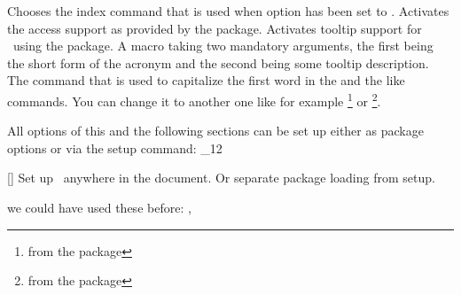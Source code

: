 \documentclass[load-preamble+]{cnltx-doc}
\makeatletter
\renewenvironment{commands}
  {%
    \cnltx@set@catcode_{12}%
    \let\command\cnltx@command
    \cnltxlist
  }
  {\endcnltxlist}
\makeatother
\begin{document}
\begin{options}
    Chooses the index command that is used when option  has been
    set to .
    Activates the access support as provided by the  package.
    Activates tooltip support for \acro\ using the
     package.
    A macro taking two mandatory arguments, the first being
    the short form of the acronym and the second being some tooltip
    description.
    The command that is used to capitalize the first word in the  and
    the like commands.  You can change it to another one like for example
    \footnote{from the  package} or
    \footnote{from the  package}.
\end{options}
 
All options of this and the following sections can be set up either as package
options or via the setup command:
\begin{commands}
  \command{acsetup}[]
   Set up \acro\ anywhere in the document.  Or separate package loading from
   setup.
\end{commands}

\begin{example}
  we could have used these before: \nato, \ny
\end{example}
\end{document}

